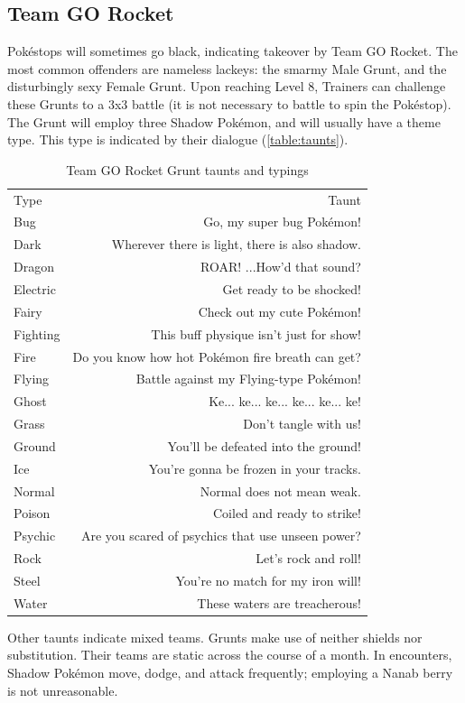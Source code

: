 \subsection{Team GO Rocket\label{subsec:rocket}}
Pokéstops will sometimes go black, indicating takeover by Team GO Rocket.
The most common offenders are nameless lackeys: the smarmy Male Grunt, and the disturbingly sexy Female Grunt.
Upon reaching Level 8, Trainers can challenge these Grunts to a 3x3 battle (it is not necessary to battle to spin the Pokéstop).
The Grunt will employ three Shadow Pokémon, and will usually have a theme type.
This type is indicated by their dialogue (\autoref{table:taunts}).
\begin{table}
\centering
\begin{tabular}{lr}
Type & Taunt\\
\Midrule
  Bug & Go, my super bug Pokémon!\\
  Dark & Wherever there is light, there is also shadow.\\
  Dragon & ROAR! ...How'd that sound?\\
  Electric & Get ready to be shocked!\\
  Fairy & Check out my cute Pokémon!\\
  Fighting & This buff physique isn't just for show!\\
  Fire & Do you know how hot Pokémon fire breath can get?\\
  Flying & Battle against my Flying-type Pokémon!\\
  Ghost & Ke... ke... ke... ke... ke... ke!\\
  Grass & Don't tangle with us!\\
  Ground & You'll be defeated into the ground!\\
  Ice & You're gonna be frozen in your tracks.\\
  Normal & Normal does not mean weak.\\
  Poison & Coiled and ready to strike!\\
  Psychic & Are you scared of psychics that use unseen power?\\
  Rock & Let's rock and roll!\\
  Steel & You're no match for my iron will!\\
  Water & These waters are treacherous!\\
\end{tabular}
  \caption{Team GO Rocket Grunt taunts and typings\label{table:taunts}}
\end{table}
Other taunts indicate mixed teams.
Grunts make use of neither shields nor substitution.
Their teams are static across the course of a month.
In encounters, Shadow Pokémon move, dodge, and attack frequently; employing a Nanab berry is not unreasonable.

